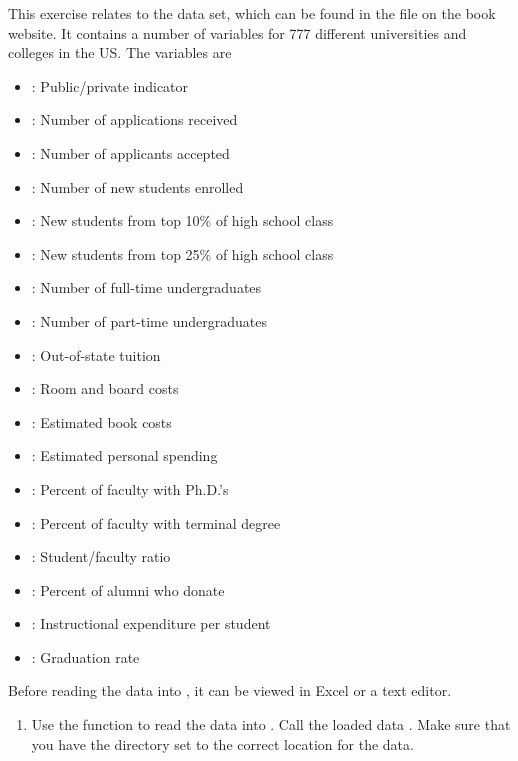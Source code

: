 \documentclass[12pt]{report}
\begin{document}
\begin{exercise}
This exercise relates to the  data set, which can be found in the file  on the book website. It contains a number of variables for 777 different universities and colleges in the US. The variables are

\begin{itemize}
    \item {}: Public/private indicator
    \item {}: Number of applications received
    \item {}: Number of applicants accepted
    \item {}: Number of new students enrolled
    \item {}: New students from top 10\% of high school class
    \item {}: New students from top 25\% of high school class
    \item {}: Number of full-time undergraduates
    \item {}: Number of part-time undergraduates
    \item {}: Out-of-state tuition
    \item {}: Room and board costs
    \item {}: Estimated book costs
    \item {}: Estimated personal spending
    \item {}: Percent of faculty with Ph.D.'s
    \item {}: Percent of faculty with terminal degree
    \item {}: Student/faculty ratio
    \item {}: Percent of alumni who donate
    \item {}: Instructional expenditure per student
    \item {}: Graduation rate
\end{itemize}

Before reading the data into , it can be viewed in Excel or a text editor.

\begin{enumerate}
    \item[(a)] Use the  function to read the data into . Call the loaded data . Make sure that you have the directory set to the correct location for the data.
    

\end{enumerate}
\end{exercise}
\end{document}
